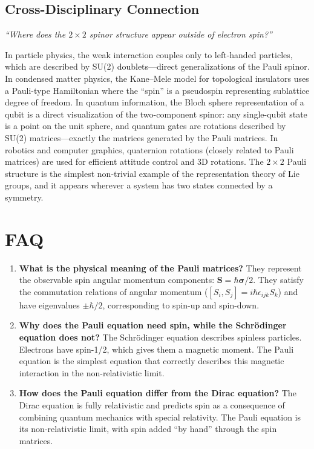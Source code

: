 \documentclass[11pt,openright]{book}
\begin{document}
\subsection*{Cross-Disciplinary Connection}
\textit{``Where does the $2 \times 2$ spinor structure appear outside of electron spin?''}

In particle physics, the weak interaction couples only to left-handed particles, which are described by SU(2) doublets---direct generalizations of the Pauli spinor. In condensed matter physics, the Kane--Mele model for topological insulators uses a Pauli-type Hamiltonian where the ``spin'' is a pseudospin representing sublattice degree of freedom. In quantum information, the Bloch sphere representation of a qubit is a direct visualization of the two-component spinor: any single-qubit state is a point on the unit sphere, and quantum gates are rotations described by SU(2) matrices---exactly the matrices generated by the Pauli matrices. In robotics and computer graphics, quaternion rotations (closely related to Pauli matrices) are used for efficient attitude control and 3D rotations. The $2 \times 2$ Pauli structure is the simplest non-trivial example of the representation theory of Lie groups, and it appears wherever a system has two states connected by a symmetry.

\section*{FAQ}

\begin{enumerate}
\item \textbf{What is the physical meaning of the Pauli matrices?}
They represent the observable spin angular momentum components: $\mathbf{S} = \hbar\boldsymbol{\sigma}/2$. They satisfy the commutation relations of angular momentum ($[S_{i}, S_{j}] = i\hbar\epsilon_{ijk}S_{k}$) and have eigenvalues $\pm\hbar/2$, corresponding to spin-up and spin-down.

\item \textbf{Why does the Pauli equation need spin, while the Schrödinger equation does not?}
The Schrödinger equation describes spinless particles. Electrons have spin-1/2, which gives them a magnetic moment. The Pauli equation is the simplest equation that correctly describes this magnetic interaction in the non-relativistic limit.

\item \textbf{How does the Pauli equation differ from the Dirac equation?}
The Dirac equation is fully relativistic and predicts spin as a consequence of combining quantum mechanics with special relativity. The Pauli equation is its non-relativistic limit, with spin added ``by hand'' through the spin matrices.
\end{enumerate}
\end{document}
